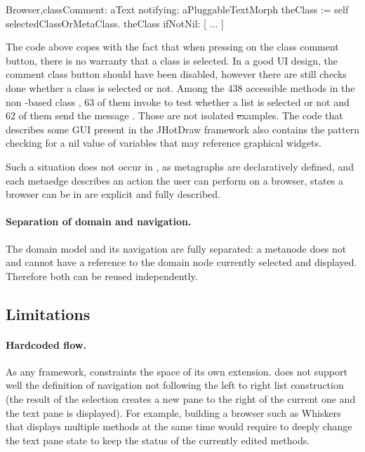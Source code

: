 \documentclass[a4paper,10pt,twoside]{book}
\begin{document}
\begin{code}
Browser\sep{}classComment: aText notifying: aPluggableTextMorph 
    theClass := self selectedClassOrMetaClass.
    theClass
        ifNotNil: [ ... ]
\end{code}

The code above copes with the fact that when pressing on the class comment button, there is no warranty that a class is selected. In a good UI design, the comment class button should have been disabled, however there are still checks done whether a class is selected or not. Among the 438 accessible methods in the non \ob-based \pharo class , 63 of them invoke  to test whether a list is selected or not and 62 of them send the message . Those are not isolated \st examples. The code that describes some GUI present in the JHotDraw framework also contains the pattern checking for a nil value of variables that may reference graphical widgets. 

Such a situation does not occur in \obf, as metagraphs are declaratively defined, and each metaedge describes an action the user can perform on a browser, states a browser can be in are explicit and fully described.

\paragraph{Separation of domain and navigation.} The domain model and its navigation are fully separated: a metanode does not and cannot have a reference to the domain node currently selected and displayed. Therefore both can be reused independently.

\subsection{Limitations} 

\paragraph{Hardcoded flow.} As any framework, \obf constraints the space of its own extension. \obf does not support well the definition of navigation not following the left  to right list construction (the result of the selection creates a new pane to the right of the current one and  the text pane is displayed). For example, building a browser such as Whiskers that displays multiple methods at the same time would require to deeply change the text pane state to keep the status of the currently edited methods. 
\end{document}
